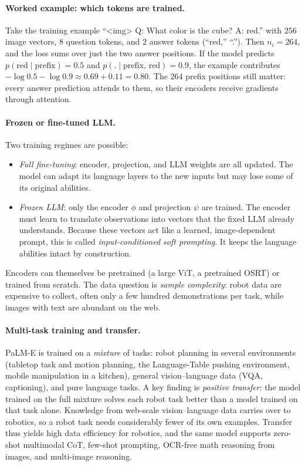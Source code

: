 \paragraph{Worked example: which tokens are trained.}
Take the training example ``<img> Q: What color is the cube? A: red.'' with
$256$ image vectors, $8$ question tokens, and $2$ answer tokens (``red,''
``.''). Then $n_i=264$, and the loss sums over just the two answer positions.
If the model predicts $p(\text{red}\mid\text{prefix})=0.5$ and
$p(\text{.}\mid\text{prefix, red})=0.9$, the example contributes
$-\log0.5-\log0.9\approx0.69+0.11=0.80$. The $264$ prefix positions still
matter: every answer prediction attends to them, so their encoders receive
gradients through attention.

\paragraph{Frozen or fine-tuned LLM.}
Two training regimes are possible:
\begin{itemize}
  \item \emph{Full fine-tuning}: encoder, projection, and LLM weights are all
    updated. The model can adapt its language layers to the new inputs but
    may lose some of its original abilities.
  \item \emph{Frozen LLM}: only the encoder $\phi$ and projection $\psi$ are
    trained. The encoder must learn to translate observations into vectors
    that the fixed LLM already understands. Because these vectors act like a
    learned, image-dependent prompt, this is called \emph{input-conditioned
    soft prompting}. It keeps the language abilities intact by construction.
\end{itemize}

\noindent
Encoders can themselves be pretrained (a large ViT, a pretrained OSRT) or
trained from scratch. The data question is \emph{sample complexity}: robot
data are expensive to collect, often only a few hundred demonstrations per
task, while images with text are abundant on the web.

\paragraph{Multi-task training and transfer.}
PaLM-E is trained on a \emph{mixture} of tasks: robot planning in several
environments (tabletop task and motion planning, the Language-Table pushing
environment, mobile manipulation in a kitchen), general vision--language data
(VQA, captioning), and pure language tasks. A key finding is \emph{positive
transfer}: the model trained on the full mixture solves each robot task
better than a model trained on that task alone. Knowledge from web-scale
vision--language data carries over to robotics, so a robot task needs
considerably fewer of its own examples. Transfer thus yields high data
efficiency for robotics, and the same model supports zero-shot multimodal
CoT, few-shot prompting, OCR-free math reasoning from images, and
multi-image reasoning.

